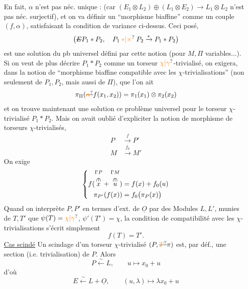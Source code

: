  En fait, $\alpha$ n'est pas néc. unique :
(car $(E_1\otimes L_2)\oplus(L_1\otimes E_2)\longrightarrow L_1\otimes L_2$ n'est pas néc. surjectif), et on va définir un  ``morphisme biaffine'' comme un couple $(f,\alpha)$, satisfaisant la condition de variance ci-dessus.
Ceci posé,
\[
\bigl(\deleted{E}P_1*P_2,\quad P_1\mathbin{\unsure{*|\times}}P_2\xrightarrow{*}P_1*P_2\bigr)
\]
 est une solution du pb universel défini par cette notion (pour $M,\Pi$ variables...).
Si on veut de plus décrire $P_1*P_2$ comme un torseur $\unsure{\chi|\gamma}$-trivialisé, on  exigera, dans la notion de ``morphisme biaffine compatible avec les $\chi$-trivialisations'' (non seulement de $P_1,P_2$, mais aussi de $\Pi$), que l'on ait
\[
\pi_{\Pi}(\deleted{\unsure{\alpha}}f(x_1,x_2))=\pi_1(x_1)\otimes\pi_2(x_2)
\]
et on trouve maintenant une solution  ce problème universel pour le torseur $\chi$-trivialisé $P_1*P_2$.
Mais on avait oublié d'expliciter la notion de morphisme de torseurs $\chi$-trivialisés,
\[
\begin{aligned}
P&\xrightarrow{f}P'\\
M&\xrightarrow{f_0}M'
\end{aligned}
\]
On exige
\[
\left\{\begin{aligned}
f(\overset{\substack{\Gamma P\\\rotatebox{-90}{$\in$}}}{x}+\overset{\substack{\Gamma M\\\rotatebox{-90}{$\in$}}}{u})&=f(x)+f_0(u)\\
\pi_{P'}(f(x))&=f_0\bigl(\pi_P(x)\bigr)
\end{aligned}\right.
\]
Quand on interprète $P,P'$ en termes d'ext. de $\underline O$ par des Modules $L,L'$, munies de $T,T'$  que $\psi(T)=\unsure{\chi|\gamma}$, $\psi'(T')=\chi$, la condition de compatibilité avec les $\chi$-trivialisations s'écrit simplement
\[
f(T)=T'.
\]
\uline{Cas scindé} Un scindage d'un torseur $\chi$-trivialisé $(P,\deleted{\unsure{T}}\pi)$ est, par déf., une section (i.e. trivialisation)  de $P$. Alors 
\[
P\xleftarrow{\sim} L,\qquad u\longmapsto x_0+u
\]
 d'où
\[
E\xleftarrow{\sim}L+\underline O,\qquad(u,\lambda)\longmapsto\lambda x_0+u
\]
